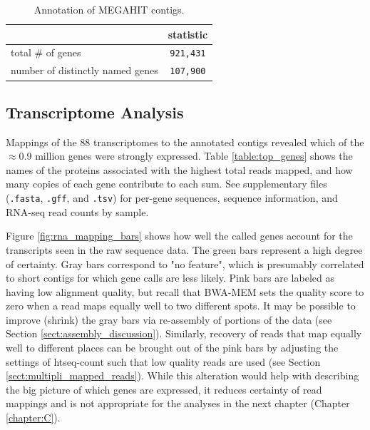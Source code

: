 \begin{table}[H]
\centering
\begin{singlespace}
\caption[Annotation of MEGAHIT contigs]
	{Annotation of MEGAHIT contigs.}
\begin{tabular}{l | c}
        & statistic  \\
\midrule
	total \# of genes & \texttt{921,431} \\ %
	number of distinctly named genes & \texttt{107,900} \\
\end{tabular}
\label{table:annotation}
\end{singlespace}
\end{table}







\subsection{Transcriptome Analysis}

Mappings of the 88 transcriptomes to the annotated contigs revealed which of the $\approx$0.9 million genes were strongly expressed.
Table \ref{table:top_genes} shows the names of the proteins associated with the highest total reads mapped, and how many copies of each gene contribute to each sum.
See supplementary files (\texttt{.fasta}, \texttt{.gff}, and \texttt{.tsv}) for per-gene sequences, sequence information, and RNA-seq read counts by sample.

Figure \ref{fig:rna_mapping_bars} shows how well the called genes account for the transcripts seen in the raw sequence data.
The green bars represent a high degree of certainty.
Gray bars correspond to "no feature", which is presumably correlated to short contigs for which gene calls are less likely.
Pink bars are labeled as having low alignment quality, but recall that BWA-MEM sets the quality score to zero when a read maps equally well to two different spots.
It may be possible to improve (shrink) the gray bars via re-assembly of portions of the data (see Section \ref{sect:assembly_discussion}).
Similarly, recovery of reads that map equally well to different places can be brought out of the pink bars by adjusting the settings of htseq-count such that low quality reads are used (see Section \ref{sect:multipli_mapped_reads}).
While this alteration would help with describing the big picture of which genes are expressed, it reduces certainty of read mappings and is not appropriate for the analyses in the next chapter (Chapter \ref{chapter:C}).


